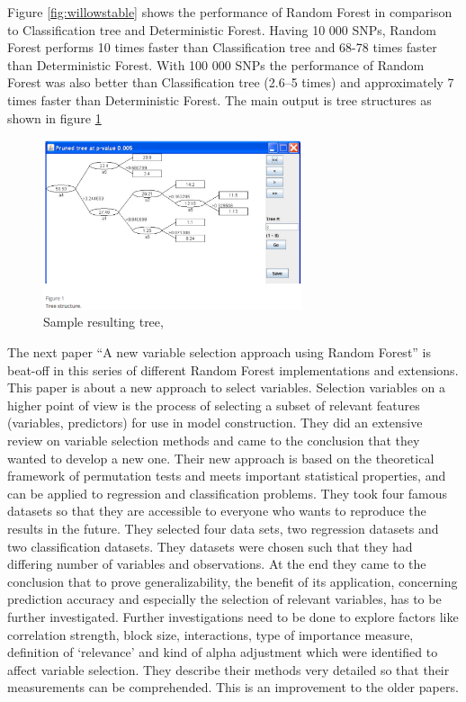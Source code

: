 \documentclass{sig-alternate-05-2015}
\begin{document}
Figure \ref{fig:willowstable} shows the performance of Random Forest in comparison to Classification tree and Deterministic Forest. Having 10 000 SNPs, Random Forest performs 10 times faster than Classification tree and 68-78 times faster than Deterministic Forest. With 100 000 SNPs the performance of Random Forest was also better than Classification tree (2.6--5 times) and approximately 7 times faster than Deterministic Forest.
The main output is tree structures as shown in figure \ref{fig:willowstree}

\begin{figure}
\centering
\includegraphics[width=3in]{willowstree}
\caption{Sample resulting tree, \cite{zhang2009willows}}
\label{fig:willowstree}
\end{figure}

The next paper ``A new variable selection approach using Random Forest'' \cite{hapfelmeier2013new} is beat-off in this series of different Random Forest implementations and extensions. This paper is about a new approach to select variables. Selection variables on a higher point of view is the process of selecting a subset of relevant features (variables, predictors) for use in model construction. They did an extensive review on variable selection methods and came to the conclusion that they wanted to develop a new one. Their new approach is based on the theoretical framework of permutation tests and meets important statistical properties, and can be applied to regression and classification problems. They took four famous datasets so that they are accessible to everyone who wants to reproduce the results in the future. They selected four data sets, two regression datasets and two classification datasets. They datasets were chosen such that they had differing number of variables and observations. At the end they came to the conclusion that to prove generalizability, the benefit of its application, concerning prediction accuracy and especially the selection of relevant variables, has to be further investigated. Further investigations need to be done to explore factors like correlation strength, block size, interactions, type of importance measure, definition of `relevance' and kind of alpha adjustment which were identified to affect variable selection. 
They describe their methods very detailed so that their measurements can be comprehended. This is an improvement to the older papers.
\end{document}
